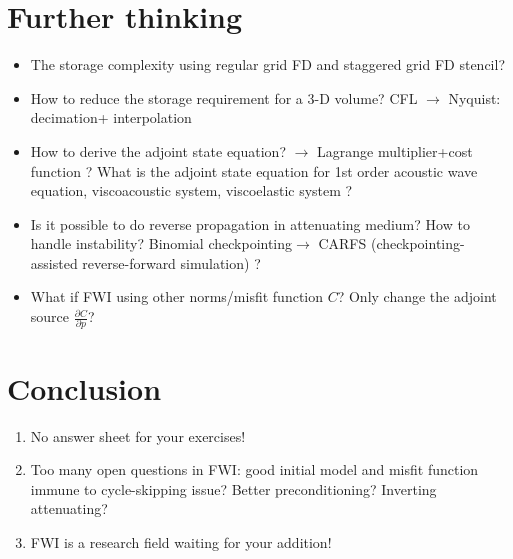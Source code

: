\section{Further thinking}
\begin{itemize}
 \item The storage complexity using regular grid FD and staggered grid FD stencil?
 \item How to reduce the storage requirement for a 3-D volume? CFL $\rightarrow$ Nyquist: decimation+ interpolation \citep{Yang_2016_DPI,Yang_2016_WRB}
 \item How to derive the adjoint state equation? $\rightarrow$ Lagrange multiplier+cost function \citep{Plessix_2006_RAS}? What is the adjoint state equation for 1st order acoustic wave equation, viscoacoustic system, viscoelastic system \citep{Yang_2016_SFM}?
 \item Is it possible to do reverse propagation in attenuating medium? How to handle instability? Binomial checkpointing$\rightarrow$ CARFS (checkpointing-assisted reverse-forward simulation) \citep{Yang_2016_CAR}?
 \item What if FWI using other norms/misfit function $C$? Only change the adjoint source $\frac{\partial C}{\partial p}$?
\end{itemize}

\section{Conclusion}
\begin{enumerate}
 \item No answer sheet for your exercises!
 
 \item Too many open questions in FWI: good initial model and misfit function immune to cycle-skipping issue? Better preconditioning? Inverting attenuating?
 
 \item FWI is a research field waiting for your addition! 

\end{enumerate}


